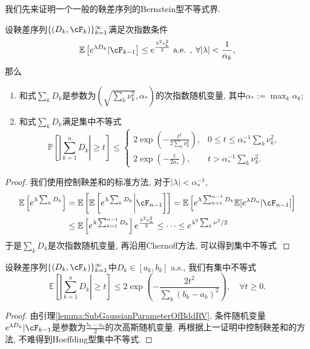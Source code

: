 我们先来证明一个一般的鞅差序列的Bernstein型不等式界. 
\begin{theorem}
	设鞅差序列$\{(D_k, \cF_k)\}_{k=1}^{\infty}$满足次指数条件
	\begin{equation*}
		\mathbb{E}\left[ e^{\lambda D_k} | \cF_{k-1} \right] 
		\leq e^{\frac{\lambda^2 \nu_k^2}{2}} \text{ a.e. },\; \forall |\lambda| < \frac{1}{\alpha_k}, 
	\end{equation*}
	那么
	\begin{enumerate}[label=(\arabic*)]
		\item 和式$\sum_k D_k$是参数为$\left( \sqrt{\sum_k \nu_k^2}, \alpha_* \right)$的次指数随机变量, 其中$\alpha_* := \max_k \alpha_k$; 
		\item 和式$\sum_k D_k$满足集中不等式
			\begin{equation*}
				\mathbb{P} \left[ \left| \sum_{k=1}^n D_k \right| \geq t \right] \leq 
				\begin{cases}
					2 \exp\left( -\frac{t^2}{2 \sum_k \nu_k^2} \right), & 0 \leq t \leq \alpha_*^{-1} \sum_k \nu_k^2, \\
					2 \exp\left(- \frac{t}{2 \alpha_*}\right), & t > \alpha_*^{-1} \sum_k \nu_k^2.
				\end{cases}
			\end{equation*}
	\end{enumerate}
\end{theorem}
\begin{proof}
	我们使用控制鞅差和的标准方法, 对于$|\lambda| < \alpha_*^{-1}$, 
	\begin{align*}
		\mathbb{E}\left[ e^{\lambda \sum_k D_k} \right]
		&= \mathbb{E}\left[ \mathbb{E}\left[ e^{\lambda \sum_k D_k} \bigg| \cF_{n-1} \right] \right] 
		= \mathbb{E}\left[ e^{\lambda \sum_{k=1}^{n-1} D_k} \mathbb{E}[e^{\lambda D_n} | \cF_{n-1}] \right] \\
		&\leq \mathbb{E}\left[ e^{\lambda \sum_{k=1}^{n-1} D_k} \right]  e^{\frac{\lambda^2 \nu_n^2}{2}} 
		\leq \dots
		\leq e^{\lambda^2 \sum_k \nu^2 / 2}
	\end{align*}
	于是$\sum_k D_k$是次指数随机变量, 再沿用Chernoff方法, 可以得到集中不等式. 
\end{proof} 

\begin{corollary}
	设鞅差序列$\{(D_k, \cF_k)\}_{k=1}^{\infty}$中$D_k \in [a_k, b_k]$ a.s., 我们有集中不等式
	\begin{equation*}
		\mathbb{E} \left[ \left| \sum_{k=1}^n D_k \right| \geq t \right]
		\leq 2 \exp \left(- \frac{2 t^2}{\sum_k (b_k - a_k)^2} \right), 
		\quad \forall t \geq 0. 
	\end{equation*}
\end{corollary}
\begin{proof}
	由引理\ref{lemma:SubGaussianParameterOfBddRV}, 条件随机变量$e^{\lambda D_k} | \cF_{k-1}$是参数为$\frac{b_k - a_k}{2}$的次高斯随机变量. 
	再根据上一证明中控制鞅差和的方法, 不难得到Hoeffding型集中不等式. 
\end{proof}

